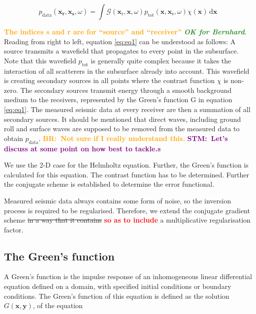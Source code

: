 \documentclass[10pt,a4paper]{article}
\newcommand{\df}[1]{\, \ensuremath{\mbox{d}#1}}
\newcommand{\commentstmtwo}[1]{\textcolor{purple}{\textbf{STM:\ #1}}}
\newcommand{\newstm}[1]{\textcolor{red}{\textbf{#1}}}
\newcommand{\newstmtwo}[1]{\textcolor{orange}{\textbf{#1}}}
\newcommand{\oldstm}[1]{\sout{#1}}
\newcommand{\brok}{\textcolor{ForestGreen}{\textit{\textbf{OK for Bernhard}}}}
\newcommand{\commentbr}[1]{\textcolor{orange}{\textbf{BR:\ #1}}}
\newcommand{\xs}{\mathbf{x}_\text{s}}
\newcommand{\xr}{\mathbf{x}_\text{r}}
\newcommand{\x}{\mathbf{x}}
\begin{document}
\begin{equation} \label{eq:eq1}
p_\text{data}(\mathbf{x_\text{r}},\mathbf{x_\text{s}},\omega) = \int \mathcal{G}(\xr, \x, \omega) p_\text{tot}(\x, \xs, \omega) \chi(\x) \df{\x} \end{equation}

\newstmtwo{The indices \textbf{s} and \textbf{r} are for ``source'' and ``receiver''} \brok.
Reading from right to left, equation \ref{eq:eq1} can be understood as follows: A source transmits a wavefield that propagates to every point in the subsurface. Note that this wavefield $p_\text{tot}$ is generally quite complex because it takes the interaction of all scatterers in the subsurface already into account. This wavefield is creating secondary sources in all points where the contrast function $\chi$ is non-zero. The secondary sources transmit energy through a smooth background medium to the receivers, represented by the Green's function G in equation \ref{eq:eq1}. \linebreak
\newline
The measured seismic data at every receiver are then a summation of all secondary sources. It should be mentioned that direct waves, including ground roll and surface waves are supposed to be removed from the measured data to obtain $p_\text{data}$.
\commentbr{Not sure if I really understand this.}
\commentstmtwo{Let's discuss at some point on how best to tackle.s}
\newline

We use the 2-D case for the Helmholtz equation. Further, the Green's function is calculated for this equation. The contrast function has to be determined. Further the conjugate scheme is established to determine the error functional.
\newline

Measured seismic data always contains some form of noise, so the inversion process is required to be regularised. Therefore, we extend the conjugate gradient scheme \oldstm{in a way that it contains} \newstm{so as to include} a multiplicative regularisation factor.

\subsection{The Green's function}
A Green's function is the impulse response of an inhomogeneous linear differential equation defined on a domain, with specified initial conditions or boundary conditions.
The Green's function of this equation is defined as the solution $G(\mathbf{x}, \mathbf{y})$, of the equation
\end{document}
